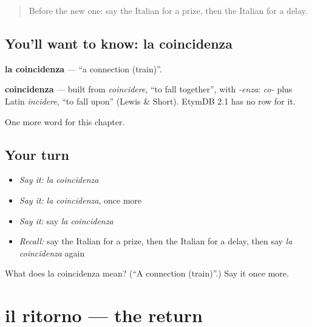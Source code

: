\label{lesson:IT-C258-coincidenza}



\begin{quote}
Before the new one: say the Italian for a prize, then the Italian for a delay.
\end{quote}

\subsection*{You'll want to know: la coincidenza}
\textbf{la coincidenza} — \textquotedblleft{}a connection (train)\textquotedblright{}.

\begin{cousinweb}
\textbf{coincidenza} — built from \emph{coincidere}, \textquotedblleft{}to fall together\textquotedblright{}, with \emph{-enza}: \emph{co-} plus Latin \emph{incidere}, \textquotedblleft{}to fall upon\textquotedblright{} (Lewis \& Short). EtymDB 2.1 has no row for it.
\end{cousinweb}

\begin{grammarlens}[title={What you've built}]
One more word for this chapter.
\end{grammarlens}

\subsection*{Your turn}
\begin{itemize}
\raggedright
  \item \emph{Say it:} \emph{la coincidenza}
  \item \emph{Say it:} \emph{la coincidenza}, once more
  \item \emph{Say it:} say \emph{la coincidenza}
  \item \emph{Recall:} say the Italian for a prize, then the Italian for a delay, then say \emph{la coincidenza} again
\end{itemize}

\begin{tcolorbox}[breakable,colback=teal!4,colframe=teal!35!black,title={Before you move on}]
What does la coincidenza mean? (\textquotedblleft{}A connection (train)\textquotedblright{}.) Say it once more.
\end{tcolorbox}
\section[il ritorno]{il ritorno — the return}

